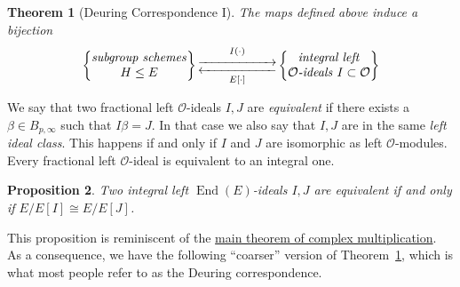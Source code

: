 \documentclass[10pt]{article}
\theoremstyle{plain}
\newtheorem{theorem}{Theorem}
\newtheorem{proposition}[theorem]{Proposition}
\theoremstyle{definition}
\DeclareMathOperator{\End}{End} %
\def\O{\ensuremath{\mathcal{O}}}
\begin{document}
\begin{theorem}[Deuring Correspondence I]\label{thm:deuring1}
    The maps defined above induce a bijection
    \begin{equation*}
        \left\{
            \begin{tabular}{@{} c @{}}
                \emph{subgroup schemes} \\
                $H\leq E$
            \end{tabular}
        \right\}
        \begin{gathered}
            \overset{I(\cdot)}{\xrightarrow{\hspace*{2cm}}} \\[-2ex]
            \underset{E[\cdot]}{\xleftarrow{\hspace*{2cm}}}
        \end{gathered}
        \left\{
            \begin{tabular}{@{} c @{}}
                \emph{integral left} \\
                $\O$\emph{-ideals} $I\subset \O$
            \end{tabular}
        \right\}
    \end{equation*}
\end{theorem}

We say that two fractional left $\O$-ideals $I,J$ are \emph{equivalent}
if there exists a $\beta\in B_{p,\infty}$ such that $I\beta = J$.
In that case we also say that $I,J$ are in the same \emph{left ideal class}.
This happens if and only if $I$ and $J$ are isomorphic as left $\O$-modules.
Every fractional left $\O$-ideal is equivalent to an integral one.

\begin{proposition}\label{prop:idealclasscurve}
    Two integral left $\End(E)$-ideals $I,J$ are equivalent if and only if
    $E/E[I]\cong E/E[J]$.
\end{proposition}


This proposition is reminiscent of the \hyperref[th:compl-mul]{main
  theorem of complex multiplication}. %
As a consequence, we have the following ``coarser'' version of
Theorem~\ref{thm:deuring1}, which is what most people refer to as the
Deuring correspondence. %
\end{document}
